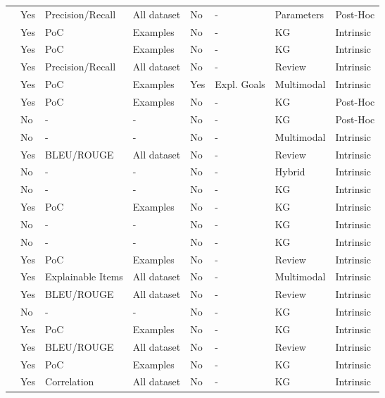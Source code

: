 \begin{xltabular}{\textwidth}{l|l|l|l|l|l|l|l}
    \cite{BRUNOT2022102021} & Yes & Precision/Recall & All dataset & No & - & Parameters & Post-Hoc \\
    \cite{TAO2022109300} & Yes & PoC & Examples & No & - & KG & Intrinsic \\
    \cite{TAO2021107217} & Yes & PoC & Examples & No & - & KG & Intrinsic \\
    \cite{YANG2021106687} & Yes & Precision/Recall & All dataset & No & - & Review & Intrinsic \\
    \cite{LIU2020102099} & Yes & PoC & Examples & Yes & Expl. Goals & Multimodal & Intrinsic \\
    \cite{LIANG202194} & Yes & PoC & Examples & No & - & KG & Post-Hoc \\
    \cite{ZANON2022109333} & No & - & - & No & - & KG & Post-Hoc \\
    \cite{PAZRUZA2024102497} & No & - & - & No & - & Multimodal & Intrinsic \\
    \cite{AI2025129692} & Yes & BLEU/ROUGE & All dataset & No & - & Review & Intrinsic \\
    \cite{WEI2023202} & No & - & - & No & - & Hybrid & Intrinsic \\
    \cite{KAUR2023100507} & No & - & - & No & - & KG & Intrinsic \\
    \cite{YANG2020106194} & Yes & PoC & Examples & No & - & KG & Intrinsic \\
    \cite{LI2024112042} & No & - & - & No & - & KG & Intrinsic \\
    \cite{WANG2020436} & No & - & - & No & - & KG & Intrinsic \\
    \cite{GUO2021185} & Yes & PoC & Examples & No & - & Review & Intrinsic \\
    \cite{MARKCHOM2023110258} & Yes & Explainable Items & All dataset & No & - & Multimodal & Intrinsic \\
    \cite{HAO2025113113} & Yes & BLEU/ROUGE & All dataset & No & - & Review & Intrinsic \\
    \cite{LIU2025113217} & No & - & - & No & - & KG & Intrinsic \\
    \cite{WU2025129780} & Yes & PoC & Examples & No & - & KG & Intrinsic \\
    \cite{AI2025129692} & Yes & BLEU/ROUGE & All dataset & No & - & Review & Intrinsic \\
    \cite{10.1145/3269206.3271739} & Yes & PoC & Examples & No & - & KG & Intrinsic \\
    \cite{10.1145/3357384.3357925} & Yes & Correlation & All dataset & No & - & KG & Intrinsic \\

\end{xltabular}
